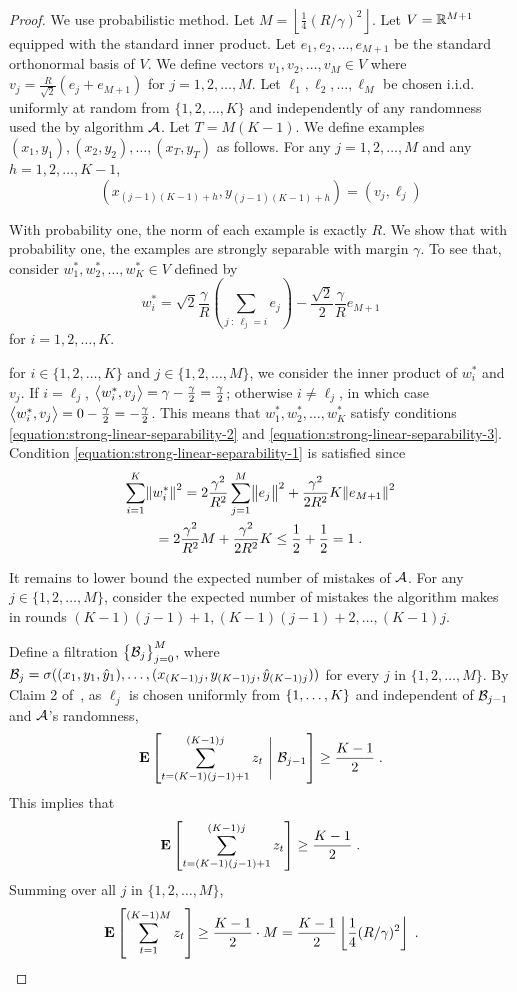 \begin{proof}
We use probabilistic method. Let $M = \left\lfloor \frac{1}{4} (R/\gamma)^2
\right\rfloor$. Let $V = \mathbb{R}^{M+1}$ equipped with the standard inner product.
Let $e_1, e_2, \dots, e_{M+1}$ be the standard orthonormal basis of $V$. We
define vectors $v_1, v_2, \dots, v_M \in V$ where $v_j = \frac{R}{\sqrt{2}}(e_j
+ e_{M+1})$ for $j=1,2,\dots,M$. Let $\ell_1, \ell_2, \dots, \ell_M$ be chosen
i.i.d. uniformly at random from $\{1,2,\dots,K\}$ and independently of any
randomness used the by algorithm $\mathcal{A}$. Let $T = M (K - 1)$. We define examples $(x_1,
y_1), (x_2, y_2), \dots, (x_T, y_T)$ as follows. For any $j=1,2,\dots,M$ and any
$h=1,2,\dots,K-1$,
$$
(x_{(j-1)(K-1) + h}, y_{(j-1)(K-1) + h}) = (v_j, \ell_j)
$$


With probability one, the norm of each example is exactly $R$.
We show that with probability
one, the examples are strongly separable with margin $\gamma$. To see
that, consider $w_1^*, w_2^*, \dots, w_K^* \in V$ defined by
$$
w_i^* = \sqrt{2} \frac{\gamma}{R} \left( \sum_{j ~:~ \ell_j = i} e_j \right) - \frac{\sqrt{2}}2 \frac{\gamma}{R} e_{M+1}
$$
for $i=1,2,\dots,K$.

for $i \in \{1,2,\dots,K\}$ and $j \in
\{1,2,\dots,M\}$, we consider the inner product of $w_i^*$ and $v_j$.
If $i = \ell_j$, $\left\langle w_i^*, v_j \right\rangle = \gamma - \frac \gamma 2 = \frac \gamma 2$;
otherwise $i \neq \ell_j$, in which case
$\left\langle w_i^*, v_j \right\rangle = 0 - \frac \gamma 2 = - \frac \gamma 2$.
This means that $w_1^*, w_2^*, \dots, w_K^*$ satisfy
conditions
\eqref{equation:strong-linear-separability-2} and
\eqref{equation:strong-linear-separability-3}. Condition \eqref{equation:strong-linear-separability-1}
is satisfied since
\begin{multline*}
\sum_{i=1}^K \norm{w_i^*}^2
= 2 \frac{\gamma^2}{R^2} \sum_{j=1}^M \norm{e_j}^2 +  \frac{\gamma^2}{2 R^2} K \norm{e_{M+1}}^2 \\
= 2 \frac{\gamma^2}{R^2} M + \frac{\gamma^2}{2 R^2} K
\le \frac{1}{2} + \frac{1}{2}
= 1 \; .
\end{multline*}

It remains to lower bound the expected number of mistakes of $\mathcal{A}$. For
any $j \in \{1,2,\dots,M\}$, consider the expected number of mistakes the
algorithm makes in rounds $(K-1)(j-1) + 1, (K-1)(j-1) + 2, \dots, (K-1)j$.

Define a filtration $\cbr{\calB_j}_{j=0}^M$,
where $\mathcal{B}_j = \sigma((x_1, y_1, \hat{y}_1), \ldots, (x_{(K-1)j}, y_{(K-1)j}, \hat{y}_{(K-1)j}))$
for every $j$ in $\{1,2,\dots,M\}$.
By Claim 2 of~\citet{Daniely-Helbertal-2013}, as $\ell_j$
is chosen uniformly from $\cbr{1,\dots,K}$ and independent of $\mathcal{B}_{j-1}$ and $\mathcal{A}$'s
randomness,
$$
\Exp \sbr{ \sum_{t=(K-1)(j-1) + 1}^{(K-1)j} z_t ~\Bigg|~ \calB_{j-1} } \geq \frac{K-1}2 \; .
$$
This implies that
$$
\Exp \sbr{ \sum_{t=(K-1)(j-1) + 1}^{(K-1)j} z_t } \ge \frac{K-1}2 \; .
$$
Summing over all $j$ in $\{1,2,\dots,M\}$,
$$
\Exp \sbr{ \sum_{t=1}^{(K-1)M} z_t} \geq \frac{K-1}2 \cdot M = \frac{K-1}2 \left\lfloor \frac 1 4 (R/\gamma)^2 \right\rfloor \; .
$$


\end{proof}
